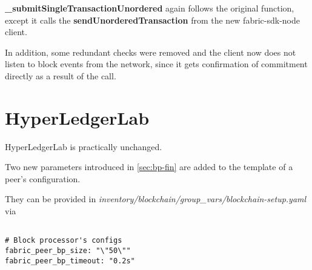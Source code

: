 \textbf{\_submitSingleTransactionUnordered} again follows the original function, except it calls the \textbf{sendUnorderedTransaction} from the new fabric-sdk-node client.

In addition, some redundant checks were removed and the client now does not listen to block events from the network, since it gets confirmation of commitment directly as a result of the call.

\section{HyperLedgerLab}\label{sec:hll}

HyperLedgerLab is practically unchanged.

Two new parameters introduced in \ref{sec:bp-fin} are added to the template of a peer's configuration.

They can be provided in \textit{inventory/blockchain/group\_vars/blockchain-setup.yaml} via

\begin{lstlisting}

# Block processor's configs
fabric_peer_bp_size: "\"50\""
fabric_peer_bp_timeout: "0.2s"

\end{lstlisting}
